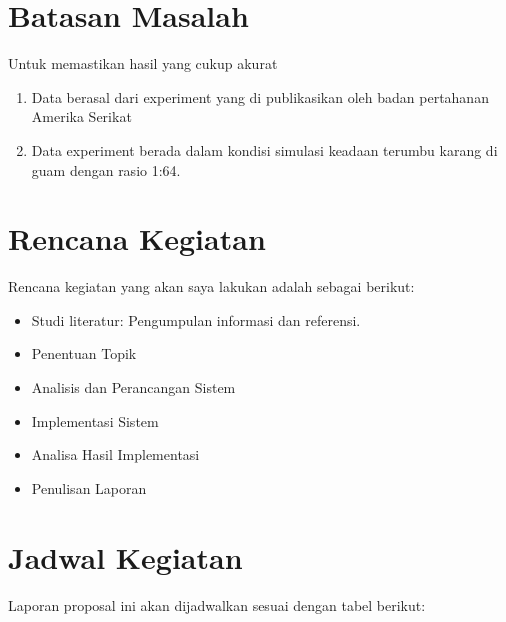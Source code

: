 \section{Batasan Masalah}
Untuk memastikan hasil yang cukup akurat
\begin{enumerate}
    \item Data berasal dari experiment yang di publikasikan oleh badan pertahanan Amerika Serikat
    \item Data experiment berada dalam kondisi simulasi keadaan terumbu karang di guam dengan rasio 1:64.
\end{enumerate}
\section{Rencana Kegiatan}
Rencana kegiatan yang akan saya lakukan adalah sebagai berikut:
\begin{itemize}
    \item Studi literatur: Pengumpulan informasi dan referensi.
    \item Penentuan Topik
    \item Analisis dan Perancangan Sistem
    \item Implementasi Sistem
    \item Analisa Hasil Implementasi
    \item Penulisan Laporan
\end{itemize}
\section{Jadwal Kegiatan}

Laporan proposal ini akan dijadwalkan sesuai dengan tabel berikut:

